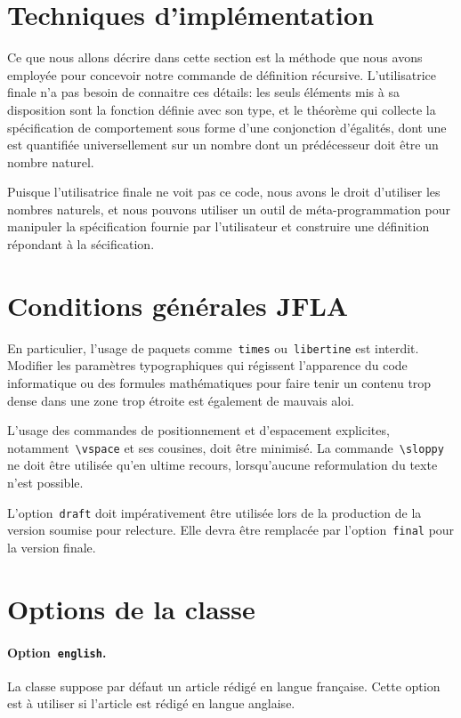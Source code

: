 \documentclass[draft]{jflart}
\newcommand{\cmd}[1]{\texttt{\textbackslash {#1}}}
\begin{document}
\section{Techniques d'implémentation}
Ce que nous allons décrire dans cette section est la méthode que nous avons
employée pour concevoir notre commande de définition récursive.
L'utilisatrice finale n'a pas besoin de connaitre ces détails: les
seuls éléments mis à sa disposition sont la fonction définie avec son
type, et le théorème qui collecte la spécification de comportement
sous forme d'une conjonction d'égalités, dont une est quantifiée
universellement sur un nombre dont un prédécesseur doit être un nombre
naturel.

Puisque l'utilisatrice finale ne voit pas ce code, nous avons le droit
d'utiliser les nombres naturels, et nous pouvons utiliser un outil de
méta-programmation pour manipuler la spécification fournie par
l'utilisateur et construire une définition répondant à la
sécification.

\section{Conditions générales JFLA}
%
En particulier, l'usage de paquets comme~\texttt{times} ou~\texttt{libertine}
est interdit.
%
Modifier les paramètres typographiques qui régissent l'apparence du code
informatique ou des formules mathématiques pour faire tenir un contenu trop
dense dans une zone trop étroite est également de mauvais aloi.

L'usage des commandes de positionnement et d'espacement explicites,
notamment~\cmd{vspace} et ses cousines, doit être minimisé.
%
La commande~\cmd{sloppy} ne doit être utilisée qu'en ultime recours,
lorsqu'aucune reformulation du texte n'est possible.

L'option~\texttt{draft} doit impérativement être utilisée lors de la production
de la version soumise pour relecture.
%
Elle devra être remplacée par l'option~\texttt{final} pour la version finale.

\section{Options de la classe}

\paragraph{Option~\texttt{english}.}

La classe suppose par défaut un article rédigé en langue française.
%
Cette option est à utiliser si l'article est rédigé en langue anglaise.
\end{document}
